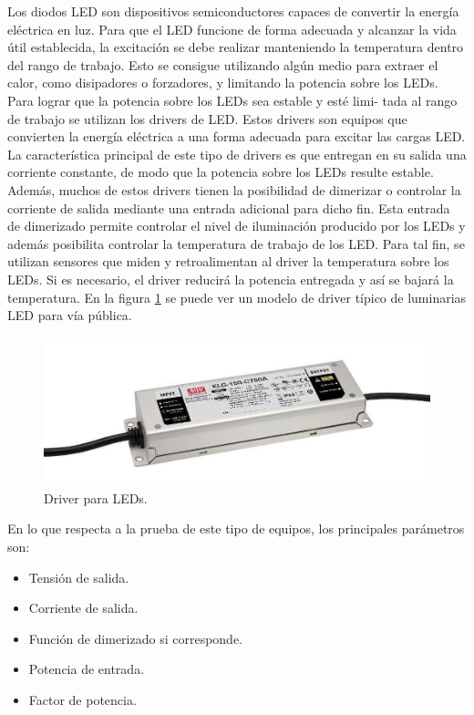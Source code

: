 Los diodos LED son dispositivos semiconductores capaces de convertir la energía eléctrica en luz. Para que el LED funcione de forma adecuada y alcanzar la vida útil establecida, la excitación se debe realizar manteniendo la temperatura dentro del rango de trabajo. Esto se consigue utilizando algún medio para extraer el calor, como disipadores o forzadores, y limitando la potencia sobre los LEDs. Para lograr que la potencia sobre los LEDs sea estable y esté limi-
tada al rango de trabajo se utilizan los drivers de LED. Estos drivers son equipos que convierten la energía eléctrica a una forma adecuada para excitar las cargas LED. La característica principal de este tipo de drivers es que entregan en su salida una corriente constante, de modo que la potencia sobre los LEDs resulte estable. Además, muchos de estos drivers tienen la posibilidad de dimerizar o controlar la corriente de salida mediante una entrada adicional para dicho fin. Esta entrada de dimerizado permite controlar el nivel de iluminación producido por los LEDs y además posibilita controlar la temperatura de trabajo de los LED. Para tal fin, se utilizan sensores que miden y retroalimentan al driver la temperatura sobre los LEDs. Si es necesario, el driver reducirá la potencia entregada y así se bajará la temperatura.
En la figura \ref{fig:Driver} se puede ver un modelo de driver típico de luminarias LED para vía pública.

\begin{figure}[ht]
	\centering
	\includegraphics[scale=.6]{./Figures/Driver.jpg}
	\caption{Driver para LEDs.}
	\label{fig:Driver}
\end{figure}


En lo que respecta a la prueba de este tipo de equipos, los principales parámetros son:
\begin{itemize}
	\item Tensión de salida.
	\item Corriente de salida.
	\item Función de dimerizado si corresponde.
	\item Potencia de entrada.
	\item Factor de potencia.
\end{itemize}

